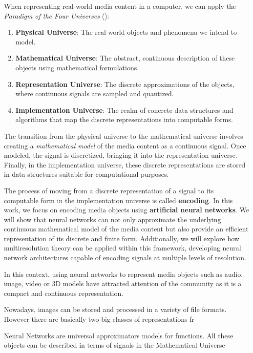 When representing real-world media content in a computer, we can apply the \textit{Paradigm of the Four Universes} (\cite{gomes1995}):

\begin{enumerate}
\item \textbf{Physical Universe}: The real-world objects and phenomena we intend to model.
\item \textbf{Mathematical Universe}: The abstract, continuous description of these objects using mathematical formulations.
\item \textbf{Representation Universe}: The discrete approximations of the objects, where continuous signals are sampled and quantized.
\item \textbf{Implementation Universe}: The realm of concrete data structures and algorithms that map the discrete representations into computable forms.
\end{enumerate}

The transition from the physical universe to the mathematical universe involves creating a \textit{mathematical model} of the media content as a continuous signal. Once modeled, the signal is discretized, bringing it into the representation universe. Finally, in the implementation universe, these discrete representations are stored in data structures suitable for computational purposes.

The process of moving from a discrete representation of a signal to its computable form in the implementation universe is called \textbf{encoding}. In this work, we focus on encoding media objects using \textbf{artificial neural networks}. We will show that neural networks can not only approximate the underlying continuous mathematical model of the media content but also provide an efficient representation of its discrete and finite form. Additionally, we will explore how multiresolution theory can be applied within this framework, developing neural network architectures capable of encoding signals at multiple levels of resolution.


In this context, using neural networks to represent media objects such as audio, image, video or 3D models have attracted attention of the community as it is a compact and continuous representation. 

Nowadays, images can be stored and processed in a variety of file formats. However there are basically two big classes of representations fr

Neural Networks are universal approximators models for functions. All these objects can be described in terms of signals in the Mathematical Universe

